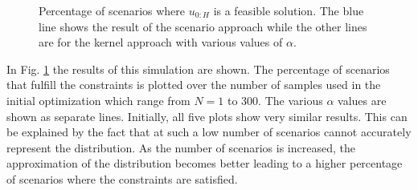 \begin{figure}[t]
		\def\file{data/AlphaTest_K300_MaxConstraint_S2.txt}
		
		\centering
		\vspace*{-0.4cm}
		
		\caption{Percentage of scenarios where $u_{0:H}$ is a feasible solution. The blue line shows the result of the scenario approach while the other lines are for the kernel approach with various values of $\alpha$.}
		\label{fig:robustness_plot}
\end{figure}


In Fig. \ref{fig:robustness_plot} the results of this simulation are shown. The percentage of scenarios that fulfill the constraints is plotted over the number of samples used in the initial optimization which range from $N = 1$ to 300. The various $\alpha$ values are shown as separate lines. Initially, all five plots show very similar results. This can be explained by the fact that at such a low number of scenarios cannot accurately represent the distribution. As the number of scenarios is increased, the approximation of the distribution becomes better leading to a higher percentage of scenarios where the constraints are satisfied.

